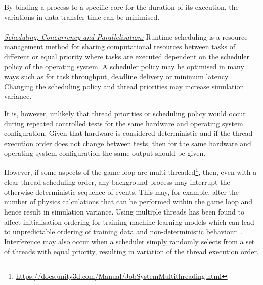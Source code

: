 \documentclass[letterpaper, 10 pt, journal, twoside]{IEEEtran}
\begin{document}
%
By binding a process to a specific core for the duration of its execution, the variations in data transfer time can be minimised.
\\\\
\noindent\underline{\textit{Scheduling, Concurrency and Parallelisation:}}
Runtime scheduling is a resource management method for sharing computational resources between tasks of different or equal priority where tasks are executed dependent on the scheduler policy of the operating system. A scheduler policy may be optimised in many ways such as for task throughput, deadline delivery or minimum latency~\cite{liu1973scheduling}. 
%
Changing the scheduling policy and thread priorities may increase simulation variance. 

It is, however, unlikely that thread priorities or scheduling policy would occur during repeated controlled tests for the same hardware and operating system configuration. Given that hardware is considered deterministic and if the thread execution order does not change between tests, then for the same hardware and operating system configuration the same output should be given. 

However, if some aspects of the game loop are multi-threaded\footnote{\url{https://docs.unity3d.com/Manual/JobSystemMultithreading.html}}, then, even with a clear thread scheduling order, any background process may interrupt the otherwise deterministic sequence of events. This may, for example, alter the number of physics calculations that can be performed within the game loop and hence result in simulation variance.
%
Using multiple threads has been found to affect initialisation ordering for training machine learning models which can lead to unpredictable ordering of training data and non-deterministic behaviour~\cite{Sculley2015,Breck2017}.
%
%
Interference may also occur when a scheduler simply randomly selects from a set of threads with equal priority, resulting in variation of the thread execution order.
\end{document}
